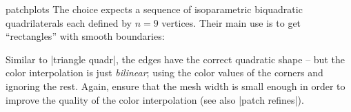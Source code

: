 {\begin{pgfplotslibrary}{patchplots}
The choice  expects a sequence of isoparametric
biquadratic quadrilaterals each defined by $n=9$ vertices. Their main use is to
get ``rectangles'' with smooth boundaries:
%
\begin{codeexample}[]
\end{codeexample}

\begin{codeexample}[]
\end{codeexample}
%
\noindent Similar to |triangle quadr|, the edges have the correct quadratic
shape -- but the color interpolation is just \emph{bilinear}; using the color
values of the corners and ignoring the rest. Again, ensure that the mesh width
is small enough in order to improve the quality of the color interpolation (see
also |patch refines|).


\end{pgfplotslibrary}}

